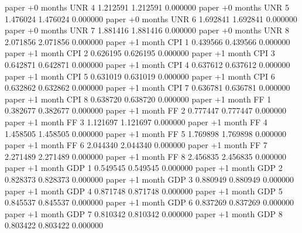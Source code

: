      paper +0 months      UNR                 4 1.212591       1.212591           0.000000
     paper +0 months      UNR                 5 1.476024       1.476024           0.000000
     paper +0 months      UNR                 6 1.692841       1.692841           0.000000
     paper +0 months      UNR                 7 1.881416       1.881416           0.000000
     paper +0 months      UNR                 8 2.071856       2.071856           0.000000
     paper  +1 month      CPI                 1 0.439566       0.439566           0.000000
     paper  +1 month      CPI                 2 0.626195       0.626195           0.000000
     paper  +1 month      CPI                 3 0.642871       0.642871           0.000000
     paper  +1 month      CPI                 4 0.637612       0.637612           0.000000
     paper  +1 month      CPI                 5 0.631019       0.631019           0.000000
     paper  +1 month      CPI                 6 0.632862       0.632862           0.000000
     paper  +1 month      CPI                 7 0.636781       0.636781           0.000000
     paper  +1 month      CPI                 8 0.638720       0.638720           0.000000
     paper  +1 month       FF                 1 0.382677       0.382677           0.000000
     paper  +1 month       FF                 2 0.777447       0.777447           0.000000
     paper  +1 month       FF                 3 1.121697       1.121697           0.000000
     paper  +1 month       FF                 4 1.458505       1.458505           0.000000
     paper  +1 month       FF                 5 1.769898       1.769898           0.000000
     paper  +1 month       FF                 6 2.044340       2.044340           0.000000
     paper  +1 month       FF                 7 2.271489       2.271489           0.000000
     paper  +1 month       FF                 8 2.456835       2.456835           0.000000
     paper  +1 month      GDP                 1 0.549545       0.549545           0.000000
     paper  +1 month      GDP                 2 0.828373       0.828373           0.000000
     paper  +1 month      GDP                 3 0.880949       0.880949           0.000000
     paper  +1 month      GDP                 4 0.871748       0.871748           0.000000
     paper  +1 month      GDP                 5 0.845537       0.845537           0.000000
     paper  +1 month      GDP                 6 0.837269       0.837269           0.000000
     paper  +1 month      GDP                 7 0.810342       0.810342           0.000000
     paper  +1 month      GDP                 8 0.803422       0.803422           0.000000
